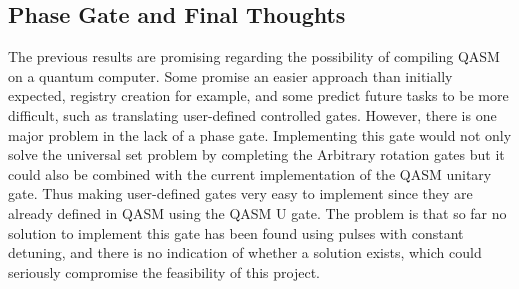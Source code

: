 \subsection{Phase Gate and Final Thoughts}
The previous results are promising regarding the possibility of compiling QASM on a quantum computer. Some promise an easier approach than initially expected, registry creation for example, and some predict future tasks to be more difficult, such as translating user-defined controlled gates.
However, there is one major problem in the lack 
of a phase gate. Implementing this gate would not only solve the universal set problem by completing the Arbitrary rotation gates but it could also be combined 
with the current implementation of the QASM unitary gate. Thus making user-defined gates very easy to implement since they are already defined in QASM using the QASM U gate.
The problem is that so far no solution to implement this gate has been found using pulses with constant detuning, and there is no indication of whether a solution exists, which could seriously compromise the feasibility of this project.


